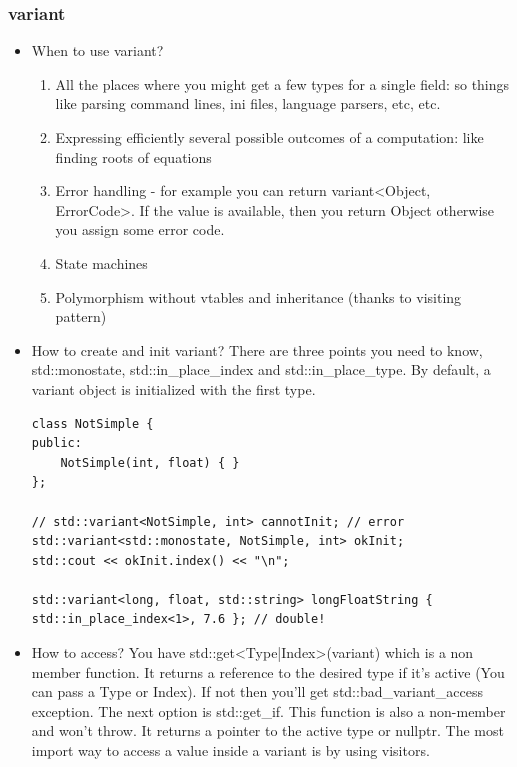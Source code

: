 \documentclass[a4paper,11pt,twoside]{book}
\begin{document}
\subsubsection{variant}

\begin{itemize}
    \item When to use variant?
        \begin{enumerate}
            \item All the places where you might get a few types for a single field: so things like parsing command lines, ini files, language parsers, etc, etc.
            \item Expressing efficiently several possible outcomes of a computation: like finding roots of equations
            \item Error handling - for example you can return variant<Object, ErrorCode>. If the value is available, then you return Object otherwise you assign some error code.
            \item State machines
            \item Polymorphism without vtables and inheritance (thanks to visiting pattern)
        \end{enumerate}

    \item How to create and init variant? There are three points you need to know, std::monostate, std::in\_place\_index and std::in\_place\_type. By default, a variant object is initialized with the first type.
\begin{lstlisting}
class NotSimple {
public:
    NotSimple(int, float) { }
};

// std::variant<NotSimple, int> cannotInit; // error
std::variant<std::monostate, NotSimple, int> okInit;
std::cout << okInit.index() << "\n";

std::variant<long, float, std::string> longFloatString { std::in_place_index<1>, 7.6 }; // double!
\end{lstlisting}

\item How to access?  You have std::get<Type|Index>(variant) which is a non member function. It returns a reference to the desired type if it’s active (You can pass a Type or Index). If not then you’ll get std::bad\_variant\_access exception. The next option is std::get\_if. This function is also a non-member and won’t throw. It returns a pointer to the active type or nullptr. The most import way to access a value inside a variant is by using visitors.


\end{itemize}
\end{document}
